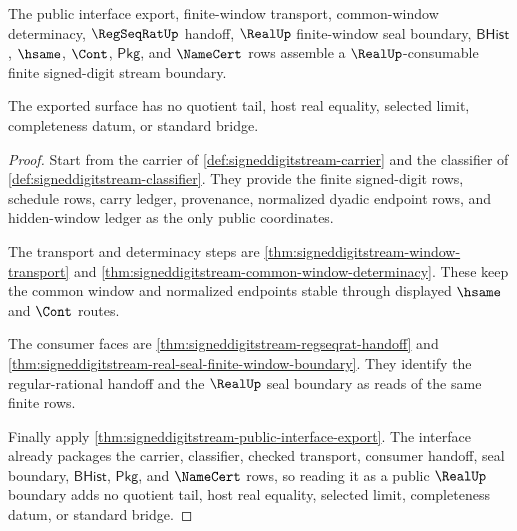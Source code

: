 \begin{theorem}
\label{thm:signeddigitstream-public-real-boundary-export}
The public interface export, finite-window transport, common-window determinacy,
$\RegSeqRatUp$ handoff, $\RealUp$ finite-window seal boundary,
$\mathsf{BHist}$, $\hsame$, $\Cont$, $\mathsf{Pkg}$, and $\NameCert$ rows
assemble a $\RealUp$-consumable finite signed-digit stream boundary.

The exported surface has no quotient tail, host real equality, selected limit,
completeness datum, or standard bridge.
\end{theorem}
\begin{proof}
Start from the carrier of \autoref{def:signeddigitstream-carrier} and the
classifier of \autoref{def:signeddigitstream-classifier}. They provide the
finite signed-digit rows, schedule rows, carry ledger, provenance, normalized
dyadic endpoint rows, and hidden-window ledger as the only public coordinates.

The transport and determinacy steps are
\autoref{thm:signeddigitstream-window-transport} and
\autoref{thm:signeddigitstream-common-window-determinacy}. These keep the common
window and normalized endpoints stable through displayed $\hsame$ and $\Cont$
routes.

The consumer faces are \autoref{thm:signeddigitstream-regseqrat-handoff} and
\autoref{thm:signeddigitstream-real-seal-finite-window-boundary}. They identify
the regular-rational handoff and the $\RealUp$ seal boundary as reads of the
same finite rows.

Finally apply \autoref{thm:signeddigitstream-public-interface-export}. The
interface already packages the carrier, classifier, checked transport, consumer
handoff, seal boundary, $\mathsf{BHist}$, $\mathsf{Pkg}$, and $\NameCert$ rows,
so reading it as a public $\RealUp$ boundary adds no quotient tail, host real
equality, selected limit, completeness datum, or standard bridge.
\end{proof}

